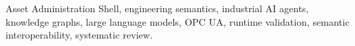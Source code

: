 \documentclass{ieeeaccess}
\begin{document}
\begin{keywords}
Asset Administration Shell, engineering semantics, industrial AI agents, knowledge graphs,
large language models, OPC UA, runtime validation, semantic interoperability, systematic review.
\end{keywords}

\titlepgskip=-21pt
\maketitle
















\EOD
\end{document}
